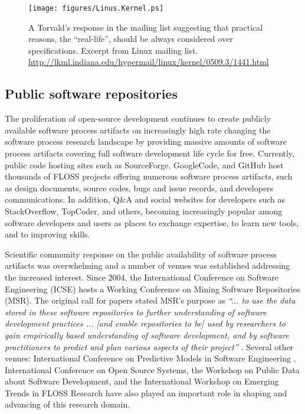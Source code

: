 \begin{figure}[ht!]
   \centering
   \texttt{[image: figures/Linus.Kernel.ps]}
   \caption{A Torvald's response in the mailing list suggesting that practical reasons, the ``real-life'', 
   should be always considered over specifications.
   Excerpt from Linux mailing list. \url{http://lkml.indiana.edu/hypermail/linux/kernel/0509.3/1441.html}}
   \label{fig:kernel}
\end{figure}

\subsection{Public software repositories}
The proliferation of open-source development continues to create publicly available software process 
artifacts on increasingly high rate changing the software process research landscape by providing 
massive amounts of software process artifacts covering full software development life cycle for free. 
Currently, public code hosting sites such as SourceForge, GoogleCode, and GitHub host thousands of FLOSS 
projects offering numerous software process artifacts, such as design documents, source codes, bugs and 
issue records, and developers communications.
In addition, Q\&A and social websites for developers such as StackOverflow, TopCoder, and others, becoming 
increasingly popular among software developers and users as places to exchange expertise, to learn new tools, 
and to improving skills.

Scientific community response on the public availability of software process artifacts was overwhelming 
and a number of venues was established addressing the increased interest. 
Since 2004, the International Conference on Software Engineering (ICSE) hosts a Working Conference on 
Mining Software Repositories (MSR). The original call for papers stated MSR's purpose as 
\textit{``... to use the data stored in these software repositories to further understanding of software 
development practices ... [and enable repositories to be] used by researchers to gain empirically based 
understanding of software development, and by software practitioners to predict and plan various aspects 
of their project''} \cite{msr2004} \cite{citeulike:7853299}. 
Several other venues: International Conference on Predictive Models in Software Engineering \cite{promise12}, 
International Conference on Open Source Systems, the Workshop on Public Data about Software Development, 
and the International Workshop on Emerging Trends in FLOSS Research have also played
an important role in shaping and advancing of this research domain.

